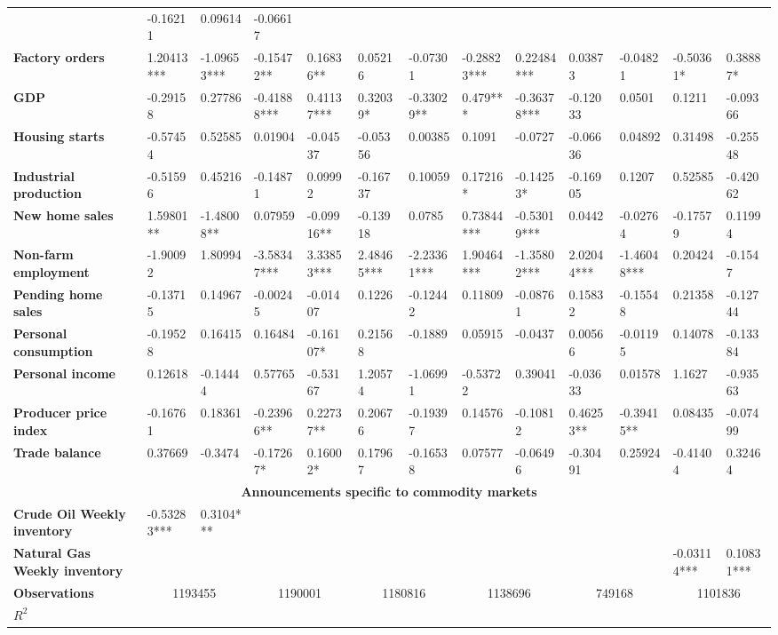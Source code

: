 \begin{sidewaystable}
{\begin{tabular}{@{}lllllllllllll@{}}
& -0.16211 & 0.09614 & -0.06617 \\ \textbf{Factory orders}& 1.20413*** & -1.09653*** & -0.15472**& 0.16836**& 0.05216 & -0.07301 & -0.28823*** & 0.22484*** & 0.03873 & -0.04821 & -0.50361* & 0.38887* \\ \textbf{GDP}& -0.29158 & 0.27786 & -0.41888***& 0.41137***& 0.32039* & -0.33029** & 0.479*** & -0.36378*** & -0.12033 & 0.0501 & 0.1211 & -0.09366 \\ \textbf{Housing starts}& -0.57454 & 0.52585 & 0.01904 & -0.04537 & -0.05356 & 0.00385 & 0.1091 & -0.0727 & -0.06636 & 0.04892 & 0.31498 & -0.25548 \\ \textbf{Industrial production}& -0.51596 & 0.45216 & -0.14871 & 0.09992 & -0.16737 & 0.10059 & 0.17216* & -0.14253* & -0.16905 & 0.1207 & 0.52585 & -0.42062 \\ \textbf{New home sales}& 1.59801**& -1.48008**& 0.07959 & -0.09916** & -0.13918 & 0.0785 & 0.73844*** & -0.53019*** & 0.0442 & -0.02764 & -0.17579 & 0.11994 \\ \textbf{Non-farm employment}& -1.90092 & 1.80994 & -3.58347***& 3.33853***& 2.48465*** & -2.23361*** & 1.90464*** & -1.35802*** & 2.02044*** & -1.46048*** & 0.20424 & -0.1547 \\ \textbf{Pending home sales}& -0.13715 & 0.14967 & -0.00245 & -0.01407 & 0.1226 & -0.12442 & 0.11809 & -0.08761 & 0.15832 & -0.15548 & 0.21358 & -0.12744 \\ \textbf{Personal consumption}& -0.19528 & 0.16415 & 0.16484 & -0.16107* & 0.21568 & -0.1889 & 0.05915 & -0.0437 & 0.00566 & -0.01195 & 0.14078 & -0.13384 \\ \textbf{Personal income}& 0.12618 & -0.14444 & 0.57765 & -0.53167 & 1.20574 & -1.06991 & -0.53722 & 0.39041 & -0.03633 & 0.01578 & 1.1627 & -0.93563 \\ \textbf{Producer price index}& -0.16761 & 0.18361 & -0.23966**& 0.22737**& 0.20676 & -0.19397 & 0.14576 & -0.10812 & 0.46253** & -0.39415** & 0.08435 & -0.07499 \\ \textbf{Trade balance}& 0.37669 & -0.3474 & -0.17267*& 0.16002*& 0.17967 & -0.16538 & 0.07577 & -0.06496 & -0.30491 & 0.25924 & -0.41404 & 0.32464 \\  \midrule \multicolumn{13}{c}{\textbf{Announcements specific to commodity markets}} \\ \midrule \textbf{Crude Oil Weekly inventory}& -0.53283*** & 0.3104*** &  &  &  &  &  &  &  &  &  &  \\ \textbf{Natural Gas Weekly inventory}&  &  &  &  &  &  &  &  &  &  & -0.03114*** & 0.10831*** \\  \midrule \textbf{Observations}             &\multicolumn{2}{c}{ 1193455 }                                                 & \multicolumn{2}{c}{ 1190001 }                                                 & \multicolumn{2}{c}{ 1180816 }                                                 & \multicolumn{2}{c}{ 1138696 }                                                 & \multicolumn{2}{c}{ 749168 }                                                   & \multicolumn{2}{c}{ 1101836 }                                                 \\ \textbf{$R^2$}             
\end{tabular}}
\end{sidewaystable}
